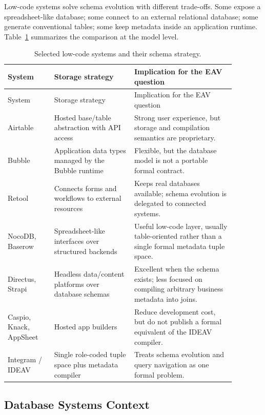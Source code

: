 \documentclass[11pt]{article}
\begin{document}
Low-code systems solve schema evolution with different trade-offs. Some expose a
spreadsheet-like database; some connect to an external relational database; some
generate conventional tables; some keep metadata inside an application runtime.
Table~\ref{tab:lowcode} summarizes the comparison at the model level.

\begin{longtable}{p{0.18\linewidth}p{0.31\linewidth}p{0.39\linewidth}}
\caption{Selected low-code systems and their schema strategy.}\label{tab:lowcode}\\
\toprule
System & Storage strategy & Implication for the EAV question \\
\midrule
\endfirsthead
\toprule
System & Storage strategy & Implication for the EAV question \\
\midrule
\endhead
Airtable & Hosted base/table abstraction with API access \citep{airtableApi} &
Strong user experience, but storage and compilation semantics are proprietary. \\
Bubble & Application data types managed by the Bubble runtime
\citep{bubbleData} & Flexible, but the database model is not a portable formal
contract. \\
Retool & Connects forms and workflows to external resources
\citep{retoolResources} & Keeps real databases available; schema evolution is
delegated to connected systems. \\
NocoDB, Baserow & Spreadsheet-like interfaces over structured backends
\citep{nocodb,baserow} & Useful low-code layer, usually table-oriented rather
than a single formal metadata tuple space. \\
Directus, Strapi & Headless data/content platforms over database schemas
\citep{directus,strapi} & Excellent when the schema exists; less focused on
compiling arbitrary business metadata into joins. \\
Caspio, Knack, AppSheet & Hosted app builders \citep{caspio,knack,appsheet} &
Reduce development cost, but do not publish a formal equivalent of the IDEAV
compiler. \\
Integram / IDEAV & Single role-coded tuple space plus metadata compiler
\citep{integramWorkflow2026,integramMcp2026} & Treats schema evolution and query
navigation as one formal problem. \\
\bottomrule
\end{longtable}

\subsection{Database Systems Context}
\end{document}

